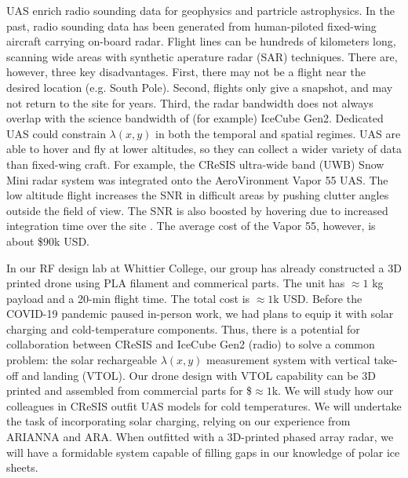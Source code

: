 \documentclass[11pt]{amsart}
\begin{document}
UAS enrich radio sounding data for geophysics and partricle astrophysics.  In the past, radio sounding data has been generated from human-piloted fixed-wing aircraft carrying on-board radar.  Flight lines can be hundreds of kilometers long, scanning wide areas with synthetic aperature radar (SAR) techniques.  There are, however, three key disadvantages.  First, there may not be a flight near the desired location (e.g. South Pole).  Second, flights only give a snapshot, and may not return to the site for years.  Third, the radar bandwidth does not always overlap with the science bandwidth of (for example) IceCube Gen2.  Dedicated UAS could constrain $\lambda(x,y)$ in both the temporal and spatial regimes.  UAS are able to hover and fly at lower altitudes, so they can collect a wider variety of data than fixed-wing craft.  For example, the CReSIS ultra-wide band (UWB) Snow Mini radar system was integrated onto the AeroVironment Vapor 55 UAS.  The low altitude flight increases the SNR in difficult areas by pushing clutter angles outside the field of view.  The SNR is also boosted by hovering due to increased integration time over the site \cite{arnold_2020}. The average cost of the Vapor 55, however, is about \$$90$k USD.  

In our RF design lab at Whittier College, our group has already constructed a 3D printed drone using PLA filament and commerical parts.  The unit has $\approx 1$ kg payload and a 20-min flight time.  The total cost is $\approx 1$k USD.  Before the COVID-19 pandemic paused in-person work, we had plans to equip it with solar charging and cold-temperature components.  Thus, there is a potential for collaboration between CReSIS and IceCube Gen2 (radio) to solve a common problem: the solar rechargeable $\lambda(x,y)$ measurement system with vertical take-off and landing (VTOL).  Our drone design with VTOL capability can be 3D printed and assembled from commercial parts for \$$\approx1$k.  We will study how our colleagues in CReSIS outfit UAS models for cold temperatures.  We will undertake the task of incorporating solar charging, relying on our experience from ARIANNA and ARA.  When outfitted with a 3D-printed phased array radar, we will have a formidable system capable of filling gaps in our knowledge of polar ice sheets.  

\end{document}
